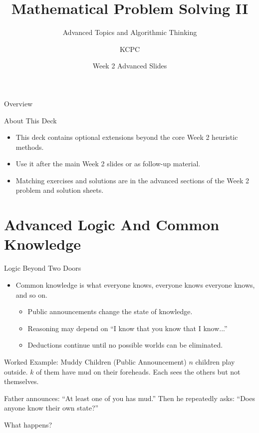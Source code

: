 \documentclass{beamer}
\title{Mathematical Problem Solving II}
\subtitle{Advanced Topics and Algorithmic Thinking}
\author{KCPC}
\date{Week 2 Advanced Slides}
\begin{document}
\begin{frame}
    \titlepage
\end{frame}

\begin{frame}{Overview}
    \tableofcontents
\end{frame}

\begin{frame}{About This Deck}
    \pause
    \begin{itemize}
        \item This deck contains optional extensions beyond the core
            Week 2 heuristic methods.
        \item Use it after the main Week 2 slides or as follow-up material.
        \item Matching exercises and solutions are in the advanced sections
            of the Week 2 problem and solution sheets.
    \end{itemize}
\end{frame}

\section{Advanced Logic And Common Knowledge}

\begin{frame}{Logic Beyond Two Doors}
    \pause
    \begin{itemize}
        \item Common knowledge is what everyone knows, everyone knows
            everyone knows, and so on.
            \begin{itemize}
                \item Public announcements change the state of knowledge.
                \item Reasoning may depend on ``I know that you know
                    that I know...''
                \item Deductions continue until no possible worlds
                    can be eliminated.
            \end{itemize}
    \end{itemize}
\end{frame}

\begin{frame}{Worked Example: Muddy Children (Public Announcement)}
    $n$ children play outside. $k$ of them have mud on their foreheads.
    Each sees the others but not themselves.

    Father announces: ``At least one of you has mud.'' Then he
    repeatedly asks: ``Does anyone know their own state?''

    What happens?
\end{frame}
\end{document}
